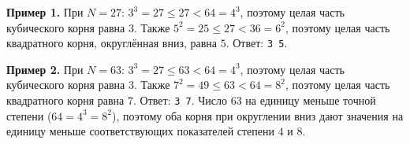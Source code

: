 \textbf{Пример 1.} При $N = 27$: $3^3 = 27 \le 27 < 64 = 4^3$, поэтому целая часть кубического корня равна $3$. Также $5^2 = 25 \le 27 < 36 = 6^2$, поэтому целая часть квадратного корня, округлённая вниз, равна $5$. Ответ: \texttt{3 5}.

\textbf{Пример 2.} При $N = 63$: $3^3 = 27 \le 63 < 64 = 4^3$, поэтому целая часть кубического корня равна $3$. Также $7^2 = 49 \le 63 < 64 = 8^2$, поэтому целая часть квадратного корня равна $7$. Ответ: \texttt{3 7}. Число $63$ на единицу меньше точной степени ($64 = 4^3 = 8^2$), поэтому оба корня при округлении вниз дают значения на единицу меньше соответствующих показателей степени $4$ и $8$.
